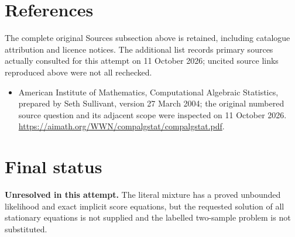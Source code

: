 \documentclass[11pt]{article}
\begin{document}
\section{References}
The complete original Sources subsection above is retained, including catalogue attribution and licence notices. The additional list records primary sources actually consulted for this attempt on 11 October 2026; uncited source links reproduced above were not all rechecked.
\begin{itemize}
\item American Institute of Mathematics, Computational Algebraic Statistics, prepared by Seth Sullivant, version 27 March 2004; the original numbered source question and its adjacent scope were inspected on 11 October 2026. \url{https://aimath.org/WWN/compalgstat/compalgstat.pdf}.
\end{itemize}
\section{Final status}
\textbf{Unresolved in this attempt.} The literal mixture has a proved unbounded likelihood and exact implicit score equations, but the requested solution of all stationary equations is not supplied and the labelled two-sample problem is not substituted.
\end{document}
